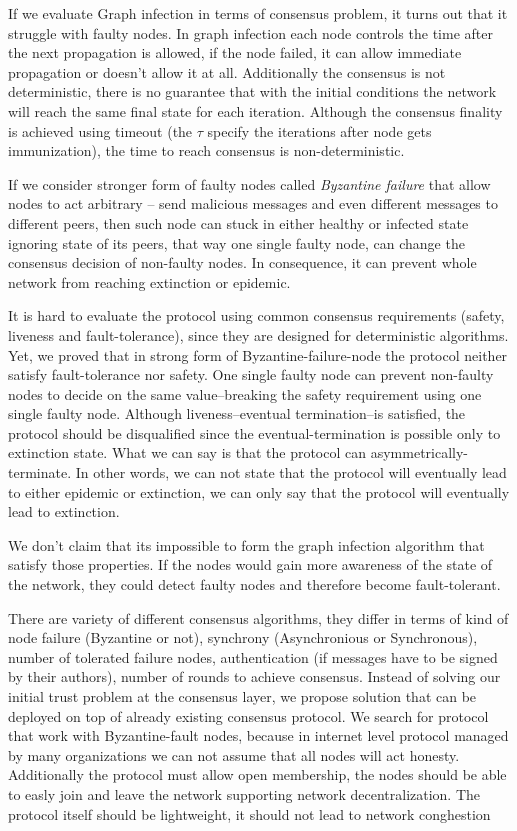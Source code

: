 \documentclass[nostrict]{szablonPG}
\begin{document}
If we evaluate Graph infection in terms of consensus problem, it turns out that it struggle with faulty nodes. In graph infection each node controls the time after the next propagation is allowed, if the node failed, it can allow immediate propagation or doesn't allow it at all. Additionally the consensus is not deterministic, there is no guarantee that with the initial conditions the network will reach the same final state for each iteration. Although the consensus finality is achieved using timeout (the $\tau$ specify the iterations after node gets immunization), the time to reach consensus is non-deterministic.

If we consider stronger form of faulty nodes called \textit{Byzantine failure}\cite{lamport2019byzantine} that allow nodes to act arbitrary -- send malicious messages and even different messages to different peers, then such node can stuck in either healthy or infected state ignoring state of its peers, that way one single faulty node, can change the consensus decision of non-faulty nodes. In consequence, it can prevent whole network from reaching extinction or epidemic. 

It is hard to evaluate the protocol using common consensus requirements (safety, liveness and fault-tolerance), since they are designed for deterministic algorithms. Yet, we proved that in strong form of Byzantine-failure-node the protocol neither satisfy fault-tolerance nor safety. One single faulty node can prevent non-faulty nodes to decide on the same value--breaking the safety requirement using one single faulty node. Although liveness--eventual termination--is satisfied, the protocol should be disqualified since the eventual-termination is possible only to extinction state. What we can say is that the protocol can asymmetrically-terminate. In other words, we can not state that the protocol will eventually lead to either epidemic or extinction, we can only say that the protocol will eventually lead to extinction.

We don't claim that its impossible to form the graph infection algorithm that satisfy those properties. If the nodes would gain more awareness of the state of the network, they could detect faulty nodes and therefore become fault-tolerant.

There are variety of different consensus algorithms, they differ in terms of kind of node failure (Byzantine or not), synchrony (Asynchronious or Synchronous), number of tolerated failure nodes, authentication (if messages have to be signed by their authors), number of rounds to achieve consensus. Instead of solving our initial trust problem at the consensus layer, we propose solution that can be deployed on top of already existing consensus protocol. We search for protocol that work with Byzantine-fault nodes, because in internet level protocol managed by many organizations we can not assume that all nodes will act honesty. Additionally the protocol must allow open membership, the nodes should be able to easly join and leave the network supporting network decentralization. The protocol itself should be lightweight, it should not lead to network conghestion 
\end{document}
